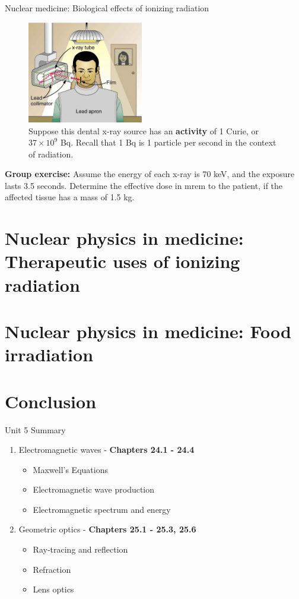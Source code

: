 \documentclass{beamer}
\begin{document}
\begin{frame}{Nuclear medicine: Biological effects of ionizing radiation}
\begin{figure}
\centering
\includegraphics[width=0.45\textwidth]{figures/dental.png}
\caption{\label{fig:dental} \footnotesize Suppose this dental x-ray source has an \textbf{activity} of 1 Curie, or $37 \times 10^9$ Bq.  Recall that 1 Bq is 1 particle per second in the context of radiation.}
\end{figure}
\footnotesize
\textbf{Group exercise:} Assume the energy of each x-ray is 70 keV, and the exposure lasts 3.5 seconds.  Determine the effective dose in mrem to the patient, if the affected tissue has a mass of 1.5 kg.
\end{frame}

\section{Nuclear physics in medicine: Therapeutic uses of ionizing radiation}

\section{Nuclear physics in medicine: Food irradiation}

\section{Conclusion}

\begin{frame}{Unit 5 Summary}
\begin{enumerate}
\item Electromagnetic waves - \textbf{Chapters 24.1 - 24.4}
\begin{itemize}
\item Maxwell's Equations
\item Electromagnetic wave production
\item Electromagnetic spectrum and energy
\end{itemize}
\item Geometric optics - \textbf{Chapters 25.1 - 25.3, 25.6}
\begin{itemize}
\item Ray-tracing and reflection
\item Refraction
\item Lens optics
\end{itemize}
\end{enumerate}
\end{frame}
\end{document}
